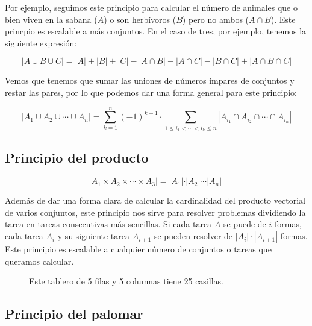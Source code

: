 Por ejemplo, seguimos este principio para calcular el número de animales que o bien viven en la sabana ($A$) o son herbívoros ($B$) pero no ambos ($A \cap B$).
Este princpio es escalable a más conjuntos.
En el caso de tres, por ejemplo, tenemos la siguiente expresión:

\[|A \cup B \cup C| = |A| + |B| + |C| - |A \cap B| - |A \cap C| - |B \cap C| + |A \cap B \cap C|\]

Vemos que tenemos que sumar las uniones de números impares de conjuntos y restar las pares, por lo que podemos dar una forma general para este principio:

\[|A_1 \cup A_2 \cup \cdots \cup A_n| = \sum_{k=1}^{n} {(-1)}^{k+1} \cdot \sum_{1 \leq i_1 < \cdots < i_k \leq n} |A_{i_1} \cap A_{i_2} \cap \cdots \cap A_{i_n}|\]

\subsection{Principio del producto}\label{principio-del-producto}

\[A_1 \times A_2 \times \cdots \times A_3| = |A_1| \cdot |A_2| \cdots |A_n|\]

Además de dar una forma clara de calcular la cardinalidad del producto vectorial de varios conjuntos, este principio nos sirve para resolver problemas dividiendo la tarea en tareas consecutivas más sencillas.
Si cada tarea $A$ se puede de $i$ formas, cada tarea $A_i$ y su siguiente tarea $A_{i+1}$ se pueden resolver de $|A_i| \cdot |A_{i+1}|$ formas.
Este principio es escalable a cualquier número de conjuntos o tareas que queramos calcular.

\begin{figure}[h!]
\begin{center}
\end{center}
\caption{Este tablero de 5 filas y 5 columnas tiene 25 casillas.}
\end{figure}

\subsection{Principio del palomar}\label{principio-del-palomar}

